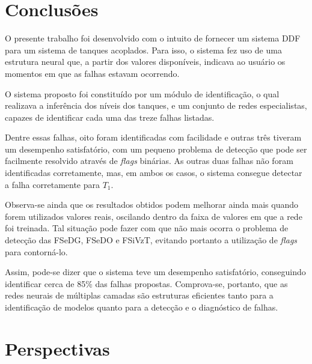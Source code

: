 \label{cap:conclusoes}

\section{Conclusões}

O presente trabalho foi desenvolvido com o intuito de fornecer um sistema DDF
para um sistema de tanques acoplados. Para isso, o sistema fez uso de uma
estrutura neural que, a partir dos valores disponíveis, indicava ao usuário os
momentos em que as falhas estavam ocorrendo.

O sistema proposto foi constituído por um módulo de identificação, o qual
realizava a inferência dos níveis dos tanques, e um conjunto de redes
especialistas, capazes de identificar cada uma das treze falhas listadas.

Dentre essas falhas, oito foram identificadas com facilidade e outras três
tiveram um desempenho satisfatório, com um pequeno problema de detecção que pode
ser facilmente resolvido através de {\it flags} binárias. As outras duas falhas
não foram identificadas corretamente, mas, em ambos os casos, o sistema consegue
detectar a falha corretamente para $T_1$.

Observa-se ainda que os resultados obtidos podem melhorar ainda mais quando
forem utilizados valores reais, oscilando dentro da faixa de valores em que a
rede foi treinada. Tal situação pode fazer com que não mais ocorra o problema de
detecção das FSeDG, FSeDO e FSiVzT, evitando portanto a utilização de {\it
flags} para contorná-lo.

Assim, pode-se dizer que o sistema teve um desempenho satisfatório, conseguindo
identificar cerca de 85\% das falhas propostas. Comprova-se, portanto, que as
redes neurais de múltiplas camadas são estruturas eficientes tanto para a
identificação de modelos quanto para a detecção e o diagnóstico de falhas.

\section{Perspectivas}

